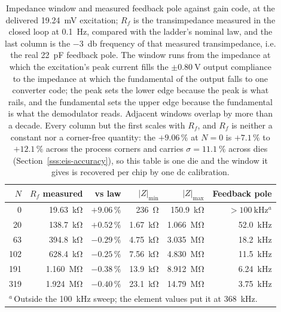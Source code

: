 \begin{table}[htbp]
  \centering
  \caption[{Impedance window and feedback pole against gain code.}]{Impedance
  window and measured feedback pole against gain code, at the delivered
  \SI{19.24}{\milli\volt} excitation; \(R_f\) is the transimpedance measured in
  the closed loop at \SI{0.1}{\hertz}, compared with the ladder's nominal law,
  and the last column is the \SI{-3}{\decibel} frequency of that measured
  transimpedance, i.e. the real \SI{22}{\pico\farad} feedback pole.
  The window runs from the impedance at which the excitation's peak current fills
  the \(\pm\SI{0.80}{\volt}\) output compliance to the impedance at which the
  fundamental of the output falls to one converter code; the peak sets the lower
  edge because the peak is what rails, and the fundamental sets the upper edge
  because the fundamental is what the demodulator reads. Adjacent windows overlap
  by more than a decade. Every column but the first scales with \(R_f\), and \(R_f\) is neither a
  constant nor a corner-free quantity: the \(+9.06\,\%\) at \(N = 0\) is
  \(+7.1\,\%\) to \(+12.1\,\%\) across the process corners and
  carries \(\sigma = \SI{11.1}{\percent}\) across dies
  (Section~\ref{sss:eis-accuracy}), so this table is one die and the window it
  gives is recovered per chip by one dc calibration.}
  \label{tab:eis-coverage}
  \begin{tabular}{rrrrrr}
    \toprule
    $N$ & $R_f$ measured & vs law & $|Z|_{\min}$ & $|Z|_{\max}$ & Feedback pole \\
    \midrule
    0   & \SI{19.63}{\kilo\ohm} & \(+9.06\,\%\) & \SI{236}{\ohm}       & \SI{150.9}{\kilo\ohm} & \(>\SI{100}{\kilo\hertz}\)$^{a}$ \\
    20  & \SI{138.7}{\kilo\ohm} & \(+0.52\,\%\) & \SI{1.67}{\kilo\ohm} & \SI{1.066}{\mega\ohm} & \SI{52.0}{\kilo\hertz} \\
    63  & \SI{394.8}{\kilo\ohm} & \(-0.29\,\%\) & \SI{4.75}{\kilo\ohm} & \SI{3.035}{\mega\ohm} & \SI{18.2}{\kilo\hertz} \\
    102 & \SI{628.4}{\kilo\ohm} & \(-0.25\,\%\) & \SI{7.56}{\kilo\ohm} & \SI{4.830}{\mega\ohm} & \SI{11.5}{\kilo\hertz} \\
    191 & \SI{1.160}{\mega\ohm} & \(-0.38\,\%\) & \SI{13.9}{\kilo\ohm} & \SI{8.912}{\mega\ohm} & \SI{6.24}{\kilo\hertz} \\
    319 & \SI{1.924}{\mega\ohm} & \(-0.40\,\%\) & \SI{23.1}{\kilo\ohm} & \SI{14.79}{\mega\ohm} & \SI{3.75}{\kilo\hertz} \\
    \bottomrule
    \multicolumn{6}{l}{\footnotesize $^{a}$\,Outside the \SI{100}{\kilo\hertz}
      sweep; the element values put it at \SI{368}{\kilo\hertz}.} \\
  \end{tabular}
\end{table}

